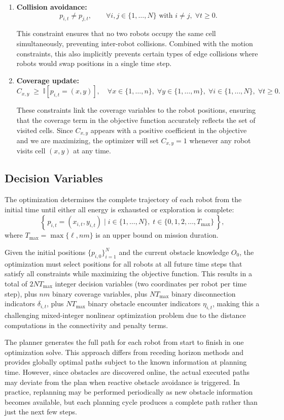\begin{enumerate}
    \item \textbf{Collision avoidance:}
    \[
        p_{i,t} \neq p_{j,t}, \qquad \forall i,j \in \{1,\ldots,N\} \text{ with } i \neq j,\; \forall t \ge 0.
    \]
    
    This constraint ensures that no two robots occupy the same cell simultaneously, preventing inter-robot collisions. Combined with the motion constraints, this also implicitly prevents certain types of edge collisions where robots would swap positions in a single time step.
    
    \item \textbf{Coverage update:}
    \[
        C_{x,y} \;\ge\; \mathbb{I}\!\left[p_{i,t} = (x,y)\right], \quad \forall x \in \{1,\ldots,n\},\; \forall y \in \{1,\ldots,m\},\; \forall i \in \{1,\ldots,N\},\; \forall t \ge 0.
    \]
    
    These constraints link the coverage variables to the robot positions, ensuring that the coverage term in the objective function accurately reflects the set of visited cells. Since $C_{x,y}$ appears with a positive coefficient in the objective and we are maximizing, the optimizer will set $C_{x,y}=1$ whenever any robot visits cell $(x,y)$ at any time.
\end{enumerate}

\subsection*{Decision Variables}

The optimization determines the complete trajectory of each robot from the initial time until either all energy is exhausted or exploration is complete:
\[
    \left\{\, p_{i,t} = (x_{i,t}, y_{i,t}) \;\big|\; i \in \{1,\ldots,N\},\; t \in \{0,1,2,\ldots,T_{\text{max}}\} \,\right\},
\]
where $T_{\text{max}} = \max\{\ell, nm\}$ is an upper bound on mission duration.

Given the initial positions $\{p_{i,0}\}_{i=1}^N$ and the current obstacle knowledge $O_0$, the optimization must select positions for all robots at all future time steps that satisfy all constraints while maximizing the objective function. This results in a total of $2NT_{\text{max}}$ integer decision variables (two coordinates per robot per time step), plus $nm$ binary coverage variables, plus $NT_{\text{max}}$ binary disconnection indicators $\delta_{i,t}$, plus $NT_{\text{max}}$ binary obstacle encounter indicators $\eta_{i,t}$, making this a challenging mixed-integer nonlinear optimization problem due to the distance computations in the connectivity and penalty terms.

The planner generates the full path for each robot from start to finish in one optimization solve. This approach differs from receding horizon methods and provides globally optimal paths subject to the known information at planning time. However, since obstacles are discovered online, the actual executed paths may deviate from the plan when reactive obstacle avoidance is triggered. In practice, replanning may be performed periodically as new obstacle information becomes available, but each planning cycle produces a complete path rather than just the next few steps.